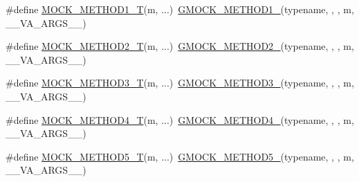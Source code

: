 \begin{DoxyCompactItemize}
\item 
\#define \mbox{\hyperlink{googletest-master_2googlemock_2include_2gmock_2gmock-generated-function-mockers_8h_a8e5b9539726be5c7a13f1aa3bcc1f29f}{M\+O\+C\+K\+\_\+\+M\+E\+T\+H\+O\+D1\+\_\+T}}(m, ...)~\mbox{\hyperlink{_obj__test_2lib_2googletest-release-1_88_81_2googlemock_2include_2gmock_2gmock-generated-function-mockers_8h_a1bc0012d62440dda77208dabdf4925c9}{G\+M\+O\+C\+K\+\_\+\+M\+E\+T\+H\+O\+D1\+\_\+}}(typename, , , m, \+\_\+\+\_\+\+V\+A\+\_\+\+A\+R\+G\+S\+\_\+\+\_\+)
\item 
\#define \mbox{\hyperlink{googletest-master_2googlemock_2include_2gmock_2gmock-generated-function-mockers_8h_adb6e8d8bd6ab614c62d8ecc2ec163e3c}{M\+O\+C\+K\+\_\+\+M\+E\+T\+H\+O\+D2\+\_\+T}}(m, ...)~\mbox{\hyperlink{_obj__test_2lib_2googletest-release-1_88_81_2googlemock_2include_2gmock_2gmock-generated-function-mockers_8h_a885295ca6bebb15efb3fc786218c5d47}{G\+M\+O\+C\+K\+\_\+\+M\+E\+T\+H\+O\+D2\+\_\+}}(typename, , , m, \+\_\+\+\_\+\+V\+A\+\_\+\+A\+R\+G\+S\+\_\+\+\_\+)
\item 
\#define \mbox{\hyperlink{googletest-master_2googlemock_2include_2gmock_2gmock-generated-function-mockers_8h_a0b1576f68e6161f106e3d9ee7e3ac28b}{M\+O\+C\+K\+\_\+\+M\+E\+T\+H\+O\+D3\+\_\+T}}(m, ...)~\mbox{\hyperlink{_obj__test_2lib_2googletest-release-1_88_81_2googlemock_2include_2gmock_2gmock-generated-function-mockers_8h_af7c77ba511c631de02bb8c45a6ed3045}{G\+M\+O\+C\+K\+\_\+\+M\+E\+T\+H\+O\+D3\+\_\+}}(typename, , , m, \+\_\+\+\_\+\+V\+A\+\_\+\+A\+R\+G\+S\+\_\+\+\_\+)
\item 
\#define \mbox{\hyperlink{googletest-master_2googlemock_2include_2gmock_2gmock-generated-function-mockers_8h_a17dde4ac8109f0bf1b73e3509e42c879}{M\+O\+C\+K\+\_\+\+M\+E\+T\+H\+O\+D4\+\_\+T}}(m, ...)~\mbox{\hyperlink{_obj__test_2lib_2googletest-release-1_88_81_2googlemock_2include_2gmock_2gmock-generated-function-mockers_8h_ab6430f2cfad9de4aca5258ea559294bb}{G\+M\+O\+C\+K\+\_\+\+M\+E\+T\+H\+O\+D4\+\_\+}}(typename, , , m, \+\_\+\+\_\+\+V\+A\+\_\+\+A\+R\+G\+S\+\_\+\+\_\+)
\item 
\#define \mbox{\hyperlink{googletest-master_2googlemock_2include_2gmock_2gmock-generated-function-mockers_8h_a3566f9bd057c5cee1841f55cbf685947}{M\+O\+C\+K\+\_\+\+M\+E\+T\+H\+O\+D5\+\_\+T}}(m, ...)~\mbox{\hyperlink{_obj__test_2lib_2googletest-release-1_88_81_2googlemock_2include_2gmock_2gmock-generated-function-mockers_8h_a9e3ecd392499ab19a4a6d3adcabf56f6}{G\+M\+O\+C\+K\+\_\+\+M\+E\+T\+H\+O\+D5\+\_\+}}(typename, , , m, \+\_\+\+\_\+\+V\+A\+\_\+\+A\+R\+G\+S\+\_\+\+\_\+)
\item 

\end{DoxyCompactItemize}
